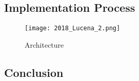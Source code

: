 
\subsection*{Implementation Process}

\begin{figure}[!ht]
    \centering
    \label{fig:2018_Lucena_Implementation_Architecture}
    \caption{Architecture}
    \texttt{[image: 2018\_Lucena\_2.png]}
\end{figure}

\subsection*{Conclusion}

